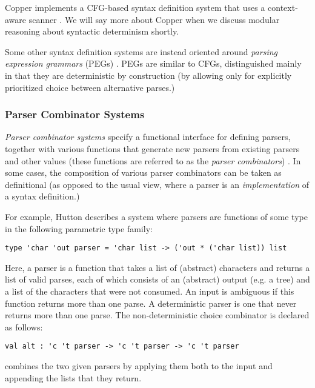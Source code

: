 
Copper implements a CFG-based syntax definition system that uses a context-aware scanner \cite{conf/gpce/WykS07}. We will say more about Copper when we discuss modular reasoning about syntactic determinism shortly.%


Some other syntax definition systems are instead oriented  around \emph{parsing expression grammars} (PEGs) \cite{Ford04a}. PEGs are similar to CFGs, distinguished mainly in that they are deterministic by construction (by allowing only for explicitly prioritized choice between alternative parses.)

\subsubsection{Parser Combinator Systems}
\emph{Parser combinator systems} specify a functional interface for defining parsers, together with various functions that generate new parsers from existing parsers and other values (these functions are referred to as the \emph{parser combinators}) \cite{Hutton1992d}. 
In some cases, the composition of various parser combinators can be taken as definitional (as opposed to the usual view, where a parser is an \emph{implementation} of a syntax definition.)

For example, Hutton describes a system where parsers are functions of some type in the following parametric type family:%
\begin{lstlisting}[numbers=none]
type 'char 'out parser = 'char list -> ('out * ('char list)) list
\end{lstlisting}
Here, a parser is a function that takes a list of (abstract) characters and returns a list of valid parses, each of which consists of an (abstract) output (e.g. a tree) and a list of the characters that were not consumed. An input is ambiguous if this function returns more than one parse. A deterministic parser is one that never returns more than one parse. The  non-deterministic choice combinator  is declared as follows: 
\begin{lstlisting}[numbers=none]
val alt : 'c 't parser -> 'c 't parser -> 'c 't parser
\end{lstlisting}
 combines the two given parsers by applying them both to the input and appending the lists that they return.

